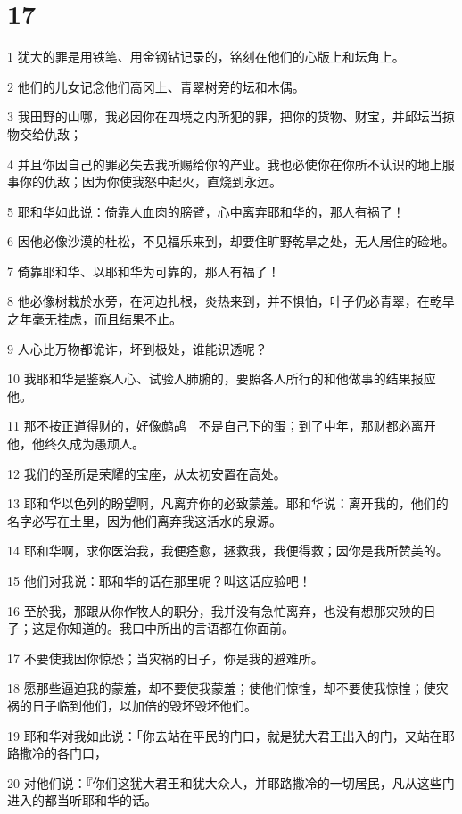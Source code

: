 \chapter{17}

\par 1 犹大的罪是用铁笔、用金钢钻记录的，铭刻在他们的心版上和坛角上。
\par 2 他们的儿女记念他们高冈上、青翠树旁的坛和木偶。
\par 3 我田野的山哪，我必因你在四境之内所犯的罪，把你的货物、财宝，并邱坛当掠物交给仇敌；
\par 4 并且你因自己的罪必失去我所赐给你的产业。我也必使你在你所不认识的地上服事你的仇敌；因为你使我怒中起火，直烧到永远。
\par 5 耶和华如此说：倚靠人血肉的膀臂，心中离弃耶和华的，那人有祸了！
\par 6 因他必像沙漠的杜松，不见福乐来到，却要住旷野乾旱之处，无人居住的硷地。
\par 7 倚靠耶和华、以耶和华为可靠的，那人有福了！
\par 8 他必像树栽於水旁，在河边扎根，炎热来到，并不惧怕，叶子仍必青翠，在乾旱之年毫无挂虑，而且结果不止。
\par 9 人心比万物都诡诈，坏到极处，谁能识透呢？
\par 10 我耶和华是鉴察人心、试验人肺腑的，要照各人所行的和他做事的结果报应他。
\par 11 那不按正道得财的，好像鹧鸪　不是自己下的蛋；到了中年，那财都必离开他，他终久成为愚顽人。
\par 12 我们的圣所是荣耀的宝座，从太初安置在高处。
\par 13 耶和华以色列的盼望啊，凡离弃你的必致蒙羞。耶和华说：离开我的，他们的名字必写在土里，因为他们离弃我这活水的泉源。
\par 14 耶和华啊，求你医治我，我便痊愈，拯救我，我便得救；因你是我所赞美的。
\par 15 他们对我说：耶和华的话在那里呢？叫这话应验吧！
\par 16 至於我，那跟从你作牧人的职分，我并没有急忙离弃，也没有想那灾殃的日子；这是你知道的。我口中所出的言语都在你面前。
\par 17 不要使我因你惊恐；当灾祸的日子，你是我的避难所。
\par 18 愿那些逼迫我的蒙羞，却不要使我蒙羞；使他们惊惶，却不要使我惊惶；使灾祸的日子临到他们，以加倍的毁坏毁坏他们。
\par 19 耶和华对我如此说：「你去站在平民的门口，就是犹大君王出入的门，又站在耶路撒冷的各门口，
\par 20 对他们说：『你们这犹大君王和犹大众人，并耶路撒冷的一切居民，凡从这些门进入的都当听耶和华的话。
